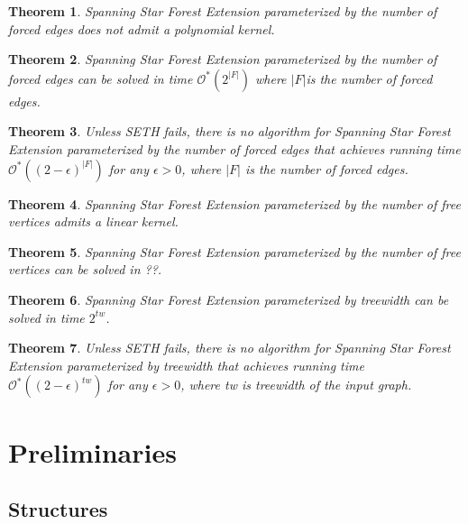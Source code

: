 \documentclass[en]{pracamgr}
\newtheorem{theorem}{Theorem}
\newcommand{\ssfep}{{\sc Spanning Star Forest Extension}}
\begin{document}
\begin{theorem}\label{thm-ssfep-nokernel}
	\ssfep{} parameterized by the number of forced edges does not admit a polynomial kernel.
\end{theorem}

\begin{theorem}\label{thm-ssfep-fe-time}
	\ssfep{} parameterized by the number of forced edges can be solved in time $\mathcal{O}^*(2^{|F|})$ where $|F|$is the number of forced edges.
\end{theorem}

\begin{theorem}\label{thm-ssfep-seth}
	Unless SETH fails, there is no algorithm for \ssfep{} parameterized by the number of forced edges that achieves running time $\mathcal{O}^*((2-\epsilon)^{|F|})$ for any $\epsilon > 0$, where $|F|$ is the number of forced edges.
\end{theorem}

\begin{theorem}\label{thm-ssfep-kernel}
	\ssfep{} parameterized by the number of free vertices admits a linear kernel.
\end{theorem}

\begin{theorem}\label{thm-ssfep-free-alg}
	\ssfep{} parameterized by the number of free vertices can be solved in ??.%
\end{theorem}

\begin{theorem}\label{thm-ssfep-tw-time}
	\ssfep{} parameterized by treewidth can be solved in time $2^{tw}$.
\end{theorem}

\begin{theorem}\label{thm-ssfep-tw-seth}
	Unless SETH fails, there is no algorithm for \ssfep{} parameterized by treewidth that achieves running time $\mathcal{O}^*((2-\epsilon)^{tw})$ for any $\epsilon > 0$, where \textup{\textrm{tw}} is treewidth of the input graph.
\end{theorem}

\chapter{Preliminaries}

\section{Structures}
\end{document}
